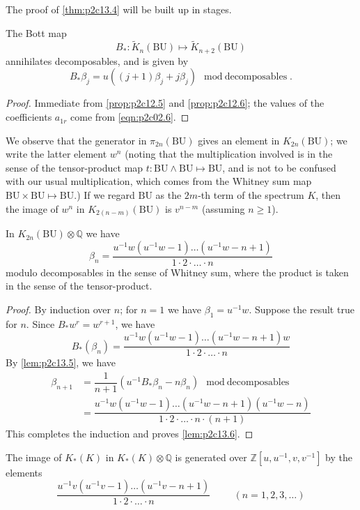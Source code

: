 \documentclass[../main]{subfiles}
\begin{document}
The proof of \eqref{thm:p2c13.4} will be built up in stages. 
\begin{customlemma}{13.5}
\label{lem:p2c13.5}
The Bott map \[B_\ast:\widetilde{K}_n(\mathrm{BU})\mapsto\widetilde{K}_{n+2}(\mathrm{BU})\] annihilates decomposables, and is given by \[B_\ast\beta_j=u((j+1)\beta_j+j\beta_j)\mod{\text{decomposables}}.\]
\end{customlemma}
\begin{proof}
Immediate from \eqref{prop:p2c12.5} and \eqref{prop:p2c12.6}; the values of the coefficients $a_{1r}$ come from \eqref{eqn:p2c02.6}. 
\end{proof}
We observe that the generator in $\pi_{2n}(\mathrm{BU})$ gives an element in $K_{2n}(\mathrm{BU})$; we write the latter element $w^n$ (noting that the multiplication involved is in the sense of the tensor-product map $t:\mathrm{BU}\wedge\mathrm{BU}\mapsto\mathrm{BU}$, and is not to be confused with our usual multiplication, which comes
from the Whitney sum map $\mathrm{BU}\times\mathrm{BU}\mapsto\mathrm{BU}$.) If we regard $\mathrm{BU}$ as the $2m$-th term of the spectrum $K$, then the image of $w^n$ in $K_{2(n-m)}(\mathrm{BU})$ is $v^{n-m}$ (assuming $n\ge 1$). 
\begin{customlemma}{13.6}
\label{lem:p2c13.6}
In $K_{2n}(\mathrm{BU})\otimes\mathbb{Q}$ we have \[\beta_n = \dfrac{u^{-1}w (u^{-1}w-1)\dots(u^{-1}w-n+1)}{1\cdot 2\cdot \ldots \cdot n}\] modulo decomposables in the sense of Whitney sum, where the product
is taken in the sense of the tensor-product.
\end{customlemma}
\begin{proof}
By induction over $n$; for $n=1$ we have $\beta_1=u^{-1} w$. Suppose the result true for $n$. Since $B_\ast w^r = w^{r+1}$, we have \[B_\ast(\beta_n) = \dfrac{u^{-1}w (u^{-1}w-1)\dots(u^{-1}w-n+1)w}{1\cdot 2\cdot \ldots \cdot n}\]
By \eqref{lem:p2c13.5}, we have \begin{align*}
\beta_{n+1} &= \dfrac{1}{n+1}
(u^{-1} B_\ast \beta_n - n\beta_n)\mod{\text{decomposables}}\\
&= \dfrac{u^{-1}w (u^{-1}w-1)\dots(u^{-1}w-n+1)(u^{-1}w-n)}{1\cdot 2\cdot \ldots \cdot n \cdot (n+1)}
\end{align*}
This completes the induction and proves \eqref{lem:p2c13.6}.
\end{proof}
\begin{customlemma}{13.7}
\label{lem:p2c13.7}
The image of $K_\ast(K)$ in $K_\ast(K)\otimes \mathbb{Q}$ is generated over $\mathbb{Z}[u,u^{-1},v,v^{-1}]$ by the elements \[\dfrac{u^{-1}v(u^{-1}v-1)\dots(u^{-1}v-n+1)}{1\cdot 2\cdot\ldots \cdot n}\hspace{1cm} (n=1,2,3,\ldots)\]
\end{customlemma}
\end{document}
